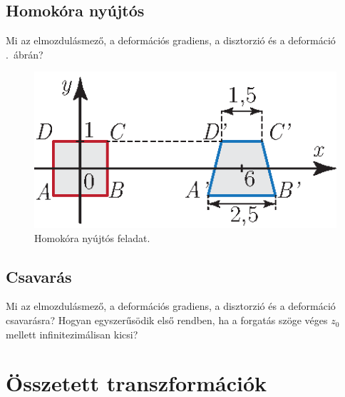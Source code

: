 \documentclass[12pt,a4paper]{scrartcl}
\begin{document}
\subsection{Homokóra nyújtós}
Mi az elmozdulásmező, a deformációs gradiens, a disztorzió és a deformáció .\ ábrán?

\begin{figure}[htb] 
\centering    
\includegraphics[scale=1]{figs/homokora_nyujtas_feladat.eps}
\caption{Homokóra nyújtós feladat.}
\label{fig:homokora_nyujtas_feladat}
\end{figure}
\FloatBarrier

\subsection{Csavarás}
Mi az elmozdulásmező, a deformációs gradiens, a disztorzió és a deformáció csavarásra? Hogyan egyszerűsödik első rendben, ha a forgatás szöge véges $z_0$ mellett infinitezimálisan kicsi?

\section{Összetett transzformációk}
\end{document}
